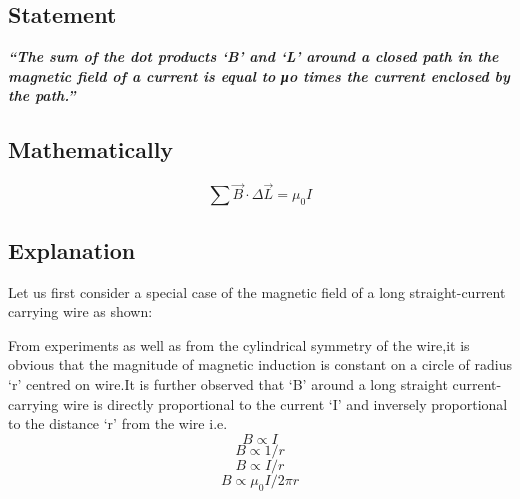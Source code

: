  \subsection{Statement}
 \textit{\textbf{“The sum of the dot products ‘B’ and ‘L’ around a closed path in the magnetic field of a current is equal to μo times the current enclosed by the path.”}}
 
 \subsection{Mathematically}
 \begin{equation}
\sum \vec{B}\cdot\Delta\vec{L}= \mu_{0}I \nonumber  
\end{equation}

\subsection{Explanation}
Let us first consider a special case of the magnetic field of a long straight-current carrying wire as shown:




From experiments as well as from the cylindrical symmetry of the wire,it is obvious that the magnitude of magnetic induction is constant on a circle of radius ‘r’ centred on wire.It is further observed that ‘B’ around a long straight current-carrying wire is directly proportional to the current ‘I’ and inversely proportional to the distance ‘r’ from the wire i.e.
\begin{equation}
    B \propto I \nonumber
\end{equation}
\begin{equation}
    B \propto 1/r \nonumber
\end{equation}
\begin{equation}
    B \propto I/r \nonumber
\end{equation}
\begin{equation}
    B \propto \mu_{0}I/2\pi r \nonumber
\end{equation}

